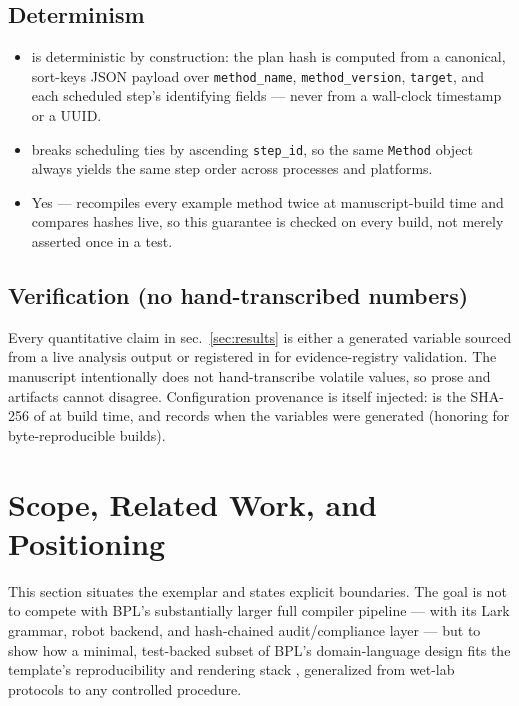 \documentclass[
  english,
]{article}
\providecommand{\tightlist}{%
  \setlength{\itemsep}{0pt}\setlength{\parskip}{0pt}}
\begin{document}
\subsection{Determinism}\label{determinism-1}

\begin{itemize}
\tightlist
\item
   is deterministic by construction: the plan
  hash is computed from a canonical, sort-keys JSON payload over
  \texttt{method\_name}, \texttt{method\_version}, \texttt{target}, and
  each scheduled step's identifying fields --- never from a wall-clock
  timestamp or a UUID.
\item
   breaks scheduling ties by ascending
  \texttt{step\_id}, so the same \texttt{Method} object always yields
  the same step order across processes and platforms.
\item
  Yes --- 
  recompiles every example method twice at manuscript-build time and
  compares hashes live, so this guarantee is checked on every build, not
  merely asserted once in a test.
\end{itemize}

\subsection{Verification (no hand-transcribed
numbers)}\label{verification-no-hand-transcribed-numbers}

Every quantitative claim in sec.~\ref{sec:results} is either a generated
variable sourced from a live analysis output or registered in
 for evidence-registry validation. The
manuscript intentionally does not hand-transcribe volatile values, so
prose and artifacts cannot disagree. Configuration provenance is itself
injected:  is the SHA-256 of
 at build time, and
 records when the variables were generated
(honoring  for byte-reproducible builds).

\newpage

\section{Scope, Related Work, and Positioning}\label{sec:scope}

This section situates the exemplar and states explicit boundaries. The
goal is not to compete with BPL's substantially larger full compiler
pipeline \citep{bpl2026} --- with its Lark grammar, robot backend, and
hash-chained audit/compliance layer --- but to show how a minimal,
test-backed subset of BPL's domain-language design fits the template's
reproducibility and rendering stack \citep{peng2011reproducible},
generalized from wet-lab protocols to any controlled procedure.
\end{document}
